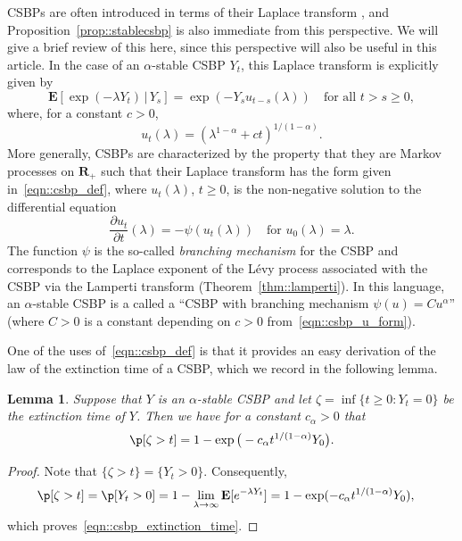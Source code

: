 \documentclass[10pt]{amsart}
\theoremstyle{plain}
\numberwithin{theorem}{section}
\newtheorem{lemma}[theorem]{Lemma}
\theoremstyle{definition}
\newcommand \E {{\mathbf E}}
\newcommand{\R}{\mathbf{R}}
\newcommand{\giv}{\,|\,}
\begin{document}
CSBPs are often introduced in terms of their Laplace transform \cite{legallspatialbranchingbook}, \cite[Chap.\,10]{kyp2006levy_fluctuations} and Proposition~\ref{prop::stablecsbp} is also immediate from this perspective. We will give a brief review of this here, since this perspective will also be useful in this article. In the case of an $\alpha$-stable CSBP $Y_t$, this Laplace transform is explicitly given by
\begin{equation}
\label{eqn::csbp_def}
\E[ \exp(-\lambda Y_t) \giv Y_s ] = \exp(-Y_s u_{t-s}(\lambda)) \quad\text{for all } t > s \geq 0,
\end{equation}
where, for a constant $c > 0$,
\begin{equation}
\label{eqn::csbp_u_form}
u_t(\lambda) = \left( \lambda^{1-\alpha} + c t\right)^{1/(1-\alpha)}.
\end{equation}
More generally, CSBPs are characterized by the property that they are Markov processes on $\R_+$ such that their Laplace transform has the form given in~\eqref{eqn::csbp_def}, where $u_t(\lambda)$, $t \geq 0$, is the non-negative solution to the differential equation
\begin{equation}
\label{eqn::csbp_diffeq}
\frac{\partial u_t}{\partial t}(\lambda) = -\psi(u_t(\lambda))\quad\text{for } u_0(\lambda) = \lambda.
\end{equation}
The function $\psi$ is the so-called \emph{branching mechanism} for the CSBP and corresponds to the Laplace exponent of the Lévy process associated with the CSBP via the Lamperti transform (Theorem~\ref{thm::lamperti}). In this language, an $\alpha$-stable CSBP is a called a ``CSBP with branching mechanism $\psi(u) = C u^\alpha$'' (where $C > 0$ is a constant depending on $c > 0$ from~\eqref{eqn::csbp_u_form}).

One of the uses of~\eqref{eqn::csbp_def} is that it provides an easy derivation of the law of the extinction time of a CSBP, which we record in the following lemma.
\begin{lemma}
\label{lem::csbp_extinction_time}
Suppose that $Y$ is an $\alpha$-stable CSBP and let $\zeta = \inf\{t \geq 0 : Y_t = 0\}$ be the extinction time of $Y$. Then we have for a constant $c_\alpha > 0$ that
\begin{equation}
\label{eqn::csbp_extinction_time}
\p[ \zeta > t] = 1- \exp\big( -c_\alpha t^{1/(1-\alpha)} Y_0 \big).
\end{equation}
\end{lemma}
\begin{proof}
Note that $\{\zeta > t\} = \{ Y_t > 0\}$. Consequently,
\begin{align*}
\p[ \zeta > t]
&= \p[ Y_t > 0 ]
= 1 - \lim_{\lambda \to \infty} \E[ e^{-\lambda Y_t}]
= 1- \exp( - c_\alpha t^{1/(1-\alpha)} Y_0),
\end{align*}
which proves~\eqref{eqn::csbp_extinction_time}.
\end{proof}
\end{document}
